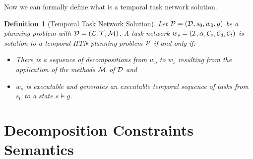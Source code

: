 \documentclass[letterpaper]{article} %
\newtheorem{definition}{Definition}
\begin{document}
Now we can formally define what is a temporal task network solution.

\begin{definition}[Temporal Task Network Solution]
Let ${\cal{P}} = ({\cal{D}}, s_0, w_0, g)$ be a planning problem with $\cal{D} = ({\cal{L}}, {\cal{T}}, {\cal{M}})$. A task network $w_s = ({\cal{I}}, \alpha, {\cal{C}}_o, {\cal{C}}_d, {\cal{C}}_t)$ is solution to a temporal HTN planning problem ${\cal{P}}$ if and only if:
\begin{itemize}
    \item There is a sequence of decompositions from $w_o$ to $w_s$ resulting from the application of the methods ${\cal{M}}$ of ${\cal{D}}$ and
\item $w_s$ is executable and generates an executable temporal sequence of tasks from $s_0$ to a state $s \models g$.
\end{itemize}
\end{definition}

\section{Decomposition Constraints Semantics}
\label{Sec:Decomposition-Constraints-Semantics}
\end{document}
